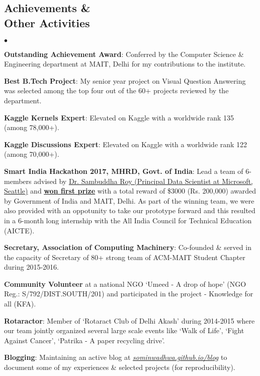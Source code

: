 \documentclass[margin,line]{res}
\newenvironment{list2}{
  \begin{list}{$\bullet$}{%
      \setlength{\itemsep}{0in}
      \setlength{\parsep}{0in} \setlength{\parskip}{0in}
      \setlength{\topsep}{0in} \setlength{\partopsep}{0in}
      \setlength{\leftmargin}{0.2in}}}{\end{list}}
\begin{document}
\begin{resume}
\section{\sc Achievements \& \\ Other Activities}
\begin{list2}
\item {\bf Outstanding Achievement Award}: Conferred by the Computer Science \& Engineering department at MAIT, Delhi for my contributions to the institute.
\item {\bf Best B.Tech Project}: My senior year project on Visual Question Answering was selected among the top four out of the 60+ projects reviewed by the department.
\item {\bf Kaggle Kernels Expert}: Elevated on Kaggle with a worldwide rank 135 (among 78,000+).
\item {\bf Kaggle Discussions Expert}: Elevated on Kaggle with a worldwide rank 122 (among 70,000+).
\item {\bf Smart India Hackathon 2017, MHRD, Govt. of India}: Lead a team of 6-members advised by {\href{https://www.linkedin.com/in/sambuddharoy/}{Dr. Sambuddha Roy (Principal Data Scientist at Microsoft, Seattle)}} and {\href{https://www.linkedin.com/feed/update/urn:li:activity:6255398180318470144}{\bf {\underline{won first prize}}}} with a total reward of \$3000 (Rs. 200,000) awarded by Government of India and MAIT, Delhi. As part of the winning team, we were also provided with an oppotunity to take our prototype forward and this resulted in a 6-month long internship with the All India Council for Technical Education (AICTE).
\item {\bf Secretary, Association of Computing Machinery}: Co-founded \& served in the capacity of Secretary of 80+ strong team of ACM-MAIT Student Chapter during 2015-2016.
\item {\bf Community Volunteer} at a national NGO `Umeed - A drop of hope' (NGO Reg.: S/792/DIST.SOUTH/201) and participated in the project - Knowledge for all (KFA).
\item {\bf Rotaractor}: Member of `Rotaract Club of Delhi Akash' during 2014-2015 where our team jointly organized several large scale events like `Walk of Life', `Fight Against Cancer', `Patrika - A paper recycling drive'. 
\item {\bf Blogging}: Maintaining an active blog at \textit{{\href{https://sominwadhwa.github.io/blog/}{sominwadhwa.github.io/blog}}} to document some of my experiences \& selected projects (for reproducibility).
\end{list2}


\end{resume}
\end{document}
